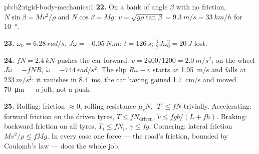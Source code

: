 \begin{solution}{pb:b2:rigid-body-mechanics:1}
\textbf{22.} On a bank of angle $\beta$ with no friction, $N\sin\beta =
Mv^2/\rho$ and $N\cos\beta = Mg$: $v = \sqrt{g\rho\tan\beta} = \qty{9.3}{m/s} =
\qty{33}{km/h}$ for \qty{10}{\degree}.

\textbf{23.} $\omega_0 = \qty{6.28}{rad/s}$, $J\dot\omega = \qty{-0.05}{N.m}$: $t =
\qty{126}{s}$; $\tfrac12J\omega_0^2 = \qty{20}{J}$ lost.

\textbf{24.}  $fN = \qty{2.4}{kN}$ pushes the car forward:
$\dot v = 2400/1200 = \qty{2.0}{m/s^2}$; on the wheel $J\dot\omega = -fNR$,
$\dot\omega = \qty{-744}{rad/s^2}$. The slip $R\omega - v$ starts at \qty{1.95}{m/s}
and falls at $\qty{233}{m/s^2}$: it vanishes in \qty{8.4}{ms}, the car having
gained \qty{1.7}{cm/s} and moved \qty{70}{\micro m} --- a jolt, not a push.

\textbf{25.} Rolling: friction $\approx 0$, rolling resistance $\mu_rN$,
$|T| \le fN$ trivially. Accelerating: forward friction on the driven
tyres, $T \le fN_{\text{driven}}$, $\dot v \le fgb/(L + fh)$. Braking:
backward friction on all tyres, $T_i \le fN_i$, $\gamma \le fg$.
Cornering: lateral friction $Mv^2/\rho \le fMg$. In every case one
force --- the road's friction, bounded by Coulomb's law --- does the
whole job.
\end{solution}
